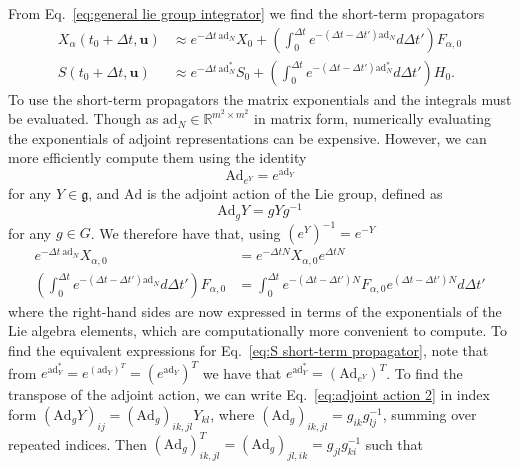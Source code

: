 From Eq.~\ref{eq:general lie group integrator} we find the short-term propagators
\begin{subequations} \label{eq:kinodynamic short term propagators}
	\begin{align}
		X_\alpha(t_0 + \Delta t, \mathbf{u}) & \approx e^{- \Delta t\ \text{ad}_N} X_0
			+ \left( \int_0^{\Delta t} e^{-(\Delta t - \Delta t') \text{ad}_N} d \Delta t' \right) F_{\alpha,0} \\
		S(t_0 + \Delta t, \mathbf{u}) & \approx e^{- \Delta t\ \text{ad}^*_N} S_0
			+ \left( \int_0^{\Delta t} e^{- (\Delta t - \Delta t') \text{ad}^*_N} d \Delta t' \right) H_0. \label{eq:S short-term propagator}
	\end{align}
\end{subequations}
To use the short-term propagators the matrix exponentials and the integrals must be evaluated. Though as $\text{ad}_N \in \mathbb{R}^{m^2 \times m^2}$ in matrix form, numerically evaluating the exponentials of adjoint representations can be expensive. However, we can more efficiently compute them using the identity \citep{rossmannLieGroupsIntroduction2006}
\begin{equation} \label{eq:Ad ad identity}
	\text{Ad}_{e^Y} = e^{\text{ad}_Y}
\end{equation}
for any $Y \in \mathfrak{g}$, and $\text{Ad}$ is the adjoint action of the Lie group, defined as
\begin{equation} \label{eq:adjoint action 2}
\text{Ad}_g Y = g Y g^{-1}
\end{equation} 
for any $g \in G$. We therefore have that, using $(e^{Y})^{-1} = e^{-Y}$
\begin{subequations} \label{eq:exp expressions for kinematic eom}
	\begin{align}
		e^{-\Delta t\ \text{ad}_N} X_{\alpha, 0} & = e^{- \Delta t N} X_{\alpha, 0} e^{\Delta t N} \\
		\left( \int_0^{\Delta t} e^{-(\Delta t - \Delta t') \text{ad}_N} d \Delta t' \right) F_{\alpha, 0} & = \int_0^{\Delta t} e^{- (\Delta t - \Delta t') N} F_{\alpha, 0} e^{(\Delta t - \Delta t') N}  d \Delta t'
	\end{align}
\end{subequations}
where the right-hand sides are now expressed in terms of the exponentials of the Lie algebra elements, which are computationally more convenient to compute. To find the equivalent expressions for Eq.~\ref{eq:S short-term propagator}, note that from $e^{\text{ad}^*_Y} = e^{(\text{ad}_Y)^T} = (e^{\text{ad}_Y})^T$ we have that $e^{\text{ad}^*_Y} = (\text{Ad}_{ e^Y })^T$. To find the transpose of the adjoint action, we can write Eq.~\ref{eq:adjoint action 2} in index form $(\text{Ad}_g Y)_{ij} = (\text{Ad}_g)_{ik, jl} Y_{kl}$, where $(\text{Ad}_g)_{ik, jl} = g_{ik} g^{-1}_{lj}$, summing over repeated indices. Then $(\text{Ad}_g)^T_{ik, jl} = (\text{Ad}_g)_{jl, ik} = g_{jl} g^{-1}_{ki}$ such that
